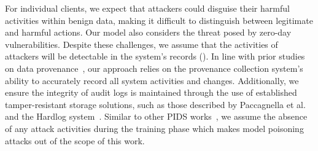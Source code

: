 For individual clients, we expect that attackers could disguise their harmful activities within benign data, making it difficult to distinguish between legitimate and harmful actions. Our model also considers the threat posed by zero-day vulnerabilities. Despite these challenges, we assume that the activities of attackers will be detectable in the system's records (\logs). In line with prior studies on data provenance~\cite{nodoze2019, priotracker2018, mzx2016, bates2017transparent, omegalog, rapsheet2020, provthings2018, dossier, inam2023sok, poirot2019, kwon18mci, winnower2018, lzx2013, ma2015accurate, ma2018kernel, mpi}, our approach relies on the provenance collection system's ability to accurately record all system activities and changes. Additionally, we ensure the integrity of audit logs is maintained through the use of established tamper-resistant storage solutions, such as those described by Paccagnella et al.~\cite{paccagnella2020custos} and the Hardlog system~\cite{hardlog}. Similar to other PIDS works~\cite{cheng2023kairos, flash2024, yangprographer, wang2022threatrace, provdetector2020}, we assume the absence of any attack activities during the training phase which makes model poisoning attacks out of the scope of this work.




